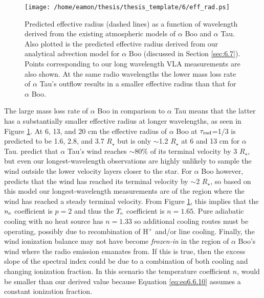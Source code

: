 \begin{figure}[hbt!]
\centering 
          \texttt{[image: /home/eamon/thesis/thesis\_template/6/eff\_rad.ps]}
\caption[Predicted effective radius as a function of wavelength for $\alpha$ Boo and $\alpha$ Tau.]{Predicted effective radius (dashed lines) as a function of wavelength derived from the existing atmospheric models of $\alpha$ Boo and $\alpha$ Tau.  Also plotted is the predicted effective radius derived from our analytical advection model for $\alpha$ Boo (discussed in Section \ref{sec:6.7}). Points corresponding to our long wavelength VLA measurements are also shown. At the same radio wavelengths the lower mass loss rate of $\alpha$ Tau's outflow results in a smaller effective radius than that for $\alpha$ Boo.}
\label{fig6.6.3}
\end{figure}

The large mass loss rate of $\alpha$ Boo in comparison to $\alpha$ Tau means that the latter has a substantially smaller effective radius at longer wavelengths, as seen in Figure \ref{fig6.6.3}. At 6, 13, and 20 cm the effective radius of $\alpha$ Boo at $\tau _{\rm{rad}}$=1/3 is predicted to be 1.6, 2.8, and 3.7 $R_{\star}$ but is only $\sim$1.2 $R_{\star}$ at 6 and 13 cm for $\alpha$ Tau. \cite{robinson_1998} predict that $\alpha$ Tau's wind reaches $\sim$80\% of its terminal velocity by 3 $R_{\star}$, but even our longest-wavelength observations are highly unlikely to sample the wind outside the lower velocity layers closer to the star. For $\alpha$ Boo however, \cite{drake_1985} predicts that the wind has reached its terminal velocity by $\sim$2 $R_{\star}$, so based on this model our longest-wavelength measurements are of the region where the wind has reached a steady terminal velocity. From Figure \ref{fig6.6.3}, this implies that the $n_{\rm{e}}$ coefficient is $p=2$ and thus the $T_{\rm{e}}$ coefficient is $n=1.65$. Pure adiabatic cooling with no heat source has $n=1.33$ so additional cooling routes must be operating, possibly due to recombination of H$^{+}$ and/or line cooling. Finally, the wind ionization balance may not have become \textit{frozen-in} in the region of $\alpha$ Boo's wind where the radio emission emanates from. If this is true, then the excess slope of the spectral index could be due to a combination of both cooling and changing ionization fraction. In this scenario the temperature coefficient $n$, would be smaller than our derived value because Equation \ref{eq:eq6.6.10} assumes a constant ionization fraction.

